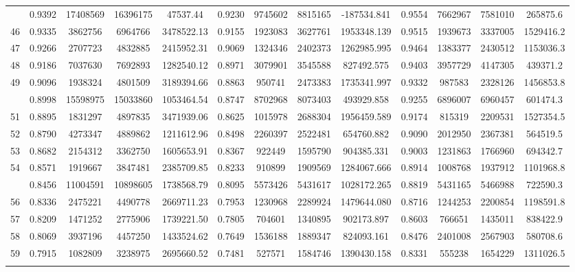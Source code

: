 \documentclass[
  12pt,
]{article}
\begin{document}
\begin{longtable}[t]{lcccccccccccc}
\addlinespace
45 & 0.9392 & 17408569 & 16396175 & 47537.44 & 0.9230 & 9745602 & 8815165 & -187534.841 & 0.9554 & 7662967 & 7581010 & 265875.6\\
46 & 0.9335 & 3862756 & 6964766 & 3478522.13 & 0.9155 & 1923083 & 3627761 & 1953348.139 & 0.9515 & 1939673 & 3337005 & 1529416.2\\
47 & 0.9266 & 2707723 & 4832885 & 2415952.31 & 0.9069 & 1324346 & 2402373 & 1262985.995 & 0.9464 & 1383377 & 2430512 & 1153036.3\\
48 & 0.9186 & 7037630 & 7692893 & 1282540.12 & 0.8971 & 3079901 & 3545588 & 827492.575 & 0.9403 & 3957729 & 4147305 & 439371.2\\
49 & 0.9096 & 1938324 & 4801509 & 3189394.66 & 0.8863 & 950741 & 2473383 & 1735341.997 & 0.9332 & 987583 & 2328126 & 1456853.8\\
\addlinespace
50 & 0.8998 & 15598975 & 15033860 & 1053464.54 & 0.8747 & 8702968 & 8073403 & 493929.858 & 0.9255 & 6896007 & 6960457 & 601474.3\\
51 & 0.8895 & 1831297 & 4897835 & 3471939.06 & 0.8625 & 1015978 & 2688304 & 1956459.589 & 0.9174 & 815319 & 2209531 & 1527354.5\\
52 & 0.8790 & 4273347 & 4889862 & 1211612.96 & 0.8498 & 2260397 & 2522481 & 654760.882 & 0.9090 & 2012950 & 2367381 & 564519.5\\
53 & 0.8682 & 2154312 & 3362750 & 1605653.91 & 0.8367 & 922449 & 1595790 & 904385.331 & 0.9003 & 1231863 & 1766960 & 694342.7\\
54 & 0.8571 & 1919667 & 3847481 & 2385709.85 & 0.8233 & 910899 & 1909569 & 1284067.666 & 0.8914 & 1008768 & 1937912 & 1101968.8\\
\addlinespace
55 & 0.8456 & 11004591 & 10898605 & 1738568.79 & 0.8095 & 5573426 & 5431617 & 1028172.265 & 0.8819 & 5431165 & 5466988 & 722590.3\\
56 & 0.8336 & 2475221 & 4490778 & 2669711.23 & 0.7953 & 1230968 & 2289924 & 1479644.080 & 0.8716 & 1244253 & 2200854 & 1198591.8\\
57 & 0.8209 & 1471252 & 2775906 & 1739221.50 & 0.7805 & 704601 & 1340895 & 902173.897 & 0.8603 & 766651 & 1435011 & 838422.9\\
58 & 0.8069 & 3937196 & 4457250 & 1433524.62 & 0.7649 & 1536188 & 1889347 & 824093.161 & 0.8476 & 2401008 & 2567903 & 580708.6\\
59 & 0.7915 & 1082809 & 3238975 & 2695660.52 & 0.7481 & 527571 & 1584746 & 1390430.158 & 0.8331 & 555238 & 1654229 & 1311026.5\\
\addlinespace

\end{longtable}
\end{document}
